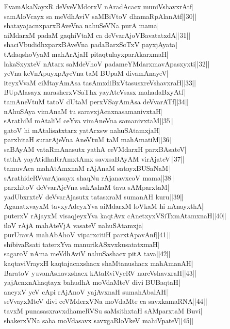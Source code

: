 \documentclass{article}
\begin{document}
EvamAkaNayxR deVveVMdorxV nAradAcacx muniVshavxrAtf|\\
samAloVcayx sa meVdhAviV saMBiVtoV dhamaRpAlanAtf||30||\\
shatayajacnxparxBAveVna nahuSeVNa purA mama|\\
aiMdarxM padaM gaqhiVtaM ca deVvarAjoVBavatatxdA||31||\\
shaciVbudidhxparxBAveVna padaBarxSoTxV payxjAyata|\\
tAdaqshoVyaM mahArAjaH pitaqtulayxparAkarxmaH|\\
lakaSxyxteV nAtarx saMdeVhoV padameYMdarxmavApasxyxti||32||\\
yeVna keVnApuyxpAyeVna taM BUpaM divamAnayeV|\\
iteyxVvaM ciMtayAmAsa tasAmxdiBxVtasusxreVshavxraH||33||\\
BUpAlasayx narasherxVSaThx yayAteVsasx mahadaBxyAtf|\\
tamAneVtuM tatoV dUtaM perxVSayAmAsa deVvarATf||34||\\
nAhuSAya vimAnaM tu saravxjAcnxnasamanivxtaH|\\
sArathiM mAtaliM ceYva vimAneVna samanivxtaM||35||\\
gatoV hi mAtalisatxtarx yatArxsw nahuSAtamxjaH|\\
parxhitaH surarAjeVna AneVtuM taM mahAmatiM||36||\\
saBAyAM vataRmAnasutx yathA ceVMdarxH parxBAsateV|\\
tathA yayAtidhaRrAmxtAmx savxsaBAyAM virAjateV||37||\\
tamuvAca mahAtAmxnaM rAjAnaM satayxBUSaNaM|\\
sArathideRVvarAjasayx shaqNu rAjanavxcoV mama||38||\\
parxhitoV deVvarAjeVna sakAshaM tava sAMparxtaM|\\
yadUbxrxteV deVvarAjasutx tatasxraM sumanAH kuru||39||\\
AganatxvayxM tavxyAdeyxYva aiMdarxM loVkaM hi nAnayxthA|\\
puterxV rAjayxM visaqjeyxYva kaqtAvx cAnetxyxVSiTxmAtamxnaH||40||\\
iloV rAjA mahAteVjA vasateV nahuSAtamxja|\\
purUravA mahAbAhoV viparxcitiH parxtApavAnf||41||\\
shibivaRsati taterxYva manurikASxvxkusatatxmaH|\\
sagaroV nAma meVdhAviV nahuSashacx pitA tava||42||\\
kaqtaviVrayxH kaqtajacnxshacx shaMtanushacx mahAmanAH|\\
BaratoV yuvanAshavxshacx kAtaRviVyeRV nareVshavxraH||43||\\
yajAcnxnAhaqtayx bahudhA moVdaMteV divi BUBaqtaH|\\
aneyxV yeV cApi rAjAnoV yajAvxnaH sumahAbalAH|\\
seVvayxMteV divi ceVMderxVNa moVdaMte ca savxkamaRNA||44||\\
tavxM punasasxravxdhameRVSu saMsithxtaH sAMparxtaM Buvi|\\
shakerxVNa saha moVdasavx savxgaRloVkeV mahiVpateV||45||\\
\end{document}
